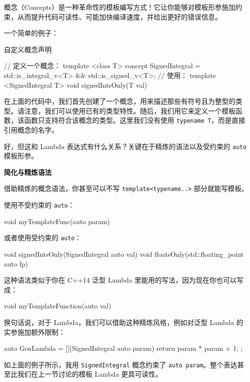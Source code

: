 概念（Concepts）是一种革命性的模板编写方式！它让你能够对模板形参施加约束，从而提升代码可读性、可能加快编译速度，并给出更好的错误信息。

一个简单的例子：

自定义概念声明

\begin{codebox}
// 定义一个概念：
template <class T>
concept SignedIntegral = std::is_integral_v<T> && std::is_signed_v<T>;
// 使用：
template <SignedIntegral T>
void signedIntsOnly(T val) { }
\end{codebox}

在上面的代码中，我们首先创建了一个概念，用来描述那些有符号且为整型的类型。请注意，我们可以使用已有的类型特性。随后，我们用它来定义一个模板函数，该函数只支持符合该概念的类型。这里我们没有使用 \texttt{typename T}，而是直接引用概念的名字。

好，但这和 Lambda 表达式有什么关系？关键在于精炼的语法以及受约束的 \texttt{auto} 模板形参。

\textbf{简化与精炼语法}

借助精炼的概念语法，你甚至可以不写 \texttt{template<typename..>} 部分就能写模板。

使用不受约束的 \texttt{auto}：

\begin{codebox}
void myTemplateFunc(auto param) { }
\end{codebox}

或者使用受约束的 \texttt{auto}：

\begin{codebox}
void signedIntsOnly(SignedIntegral auto val) { }
void floatsOnly(std::floating_point auto fp) { }
\end{codebox}

这种语法类似于你在 C++14 泛型 Lambda 里能用的写法，因为现在你也可以写成：

\begin{codebox}
void myTemplateFunction(auto val) { }
\end{codebox}

换句话说，对于 Lambda，我们可以借助这种精炼风格，例如对泛型 Lambda 的实参施加额外限制：

\begin{codebox}
auto GenLambda = [](SignedIntegral auto param) { return param * param + 1; };
\end{codebox}

如上面的例子所示，我用 \texttt{SignedIntegral} 概念约束了 \texttt{auto param}。整个表达甚至比我们在上一节讨论的模板 Lambda 更具可读性。

